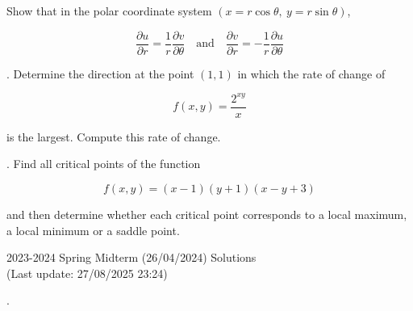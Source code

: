 \documentclass{article}
\begin{document}
\noindent Show that in the polar coordinate system $(x=r\cos\theta,\:y=r\sin\theta)$,

\[\frac{\partial u}{\partial r}=\frac1r\frac{\partial v}{\partial\theta}\quad\text{and}\quad\frac{\partial v}{\partial r}=-\frac1r\frac{\partial u}{\partial \theta}\]

\hfill

. Determine the direction at the point $(1,1)$ in which the rate of change of

\[f(x,y)=\frac{2^{xy}}x\]

\hfill

\noindent is the largest. Compute this rate of change.

\hfill

. Find all critical points of the function

\[f(x,y)=(x-1)(y+1)(x-y+3)\]

\hfill

\noindent and then determine whether each critical point corresponds to a local maximum, a local minimum or a saddle point.

\newpage

\begin{center}
2023-2024 Spring Midterm (26/04/2024) Solutions\\
(Last update: 27/08/2025 23:24)
\end{center}

.

\hfill
\end{document}
